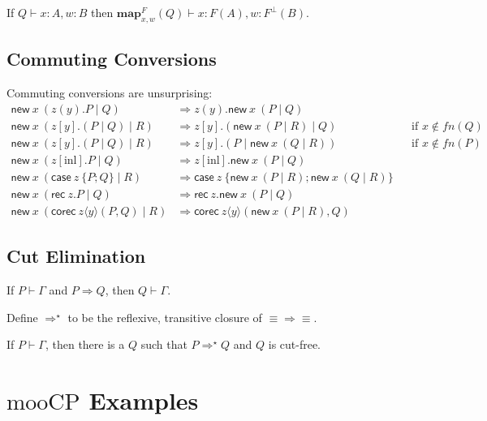 \documentclass[orivec,envcountsame]{llncs}
\newcommand{\cpdual}[1]{#1^\perp}
\newcommand{\cptyp}[2]{#1 \vdash #2}
\newcommand{\expand}[3]{\mathbf{map}^{#1}_{#2}(#3)}
\newcommand{\mkwd}[1]{\mathsf{#1}}
\newcommand{\cut}[4]{\mkwd{new}\:#1 \: (#3 \mid #4)}
\newcommand{\rec}[1]{\mkwd{rec}\:#1}
\newcommand{\corec}[5]{\mkwd{corec}\:#1 \langle #2 \rangle (#4,#5)}
\newcommand{\clabel}[1]{\mathrm{#1}}
\renewcommand{\case}[2]{\mkwd{case}\:#1\:\{#2\}}
\newcommand{\sel}[2]{#1[\clabel{#2}]}
\newcommand{\mucp}{$\mathrm{mooCP}$\xspace}
\begin{document}
\begin{lemma}
  If $\cptyp{Q}{x:A,w:B}$ then \(\cptyp{\expand{F}{x,w}{Q}}{x:F(A), w:\cpdual{F}(B)}.\)
\end{lemma}

\subsection{Commuting Conversions}

Commuting conversions are unsurprising:
{\small\begin{align*}
  \cut{x}{A}{z(y).P}{Q} &\Longrightarrow z(y).\cut{x}{A}{P}{Q} \\
  \cut{x}{A}{z[y].(P \mid Q)}{R} &\Longrightarrow z[y].(\cut{x}{A}{P}{R} \mid Q) &&\text{if $x \not\in fn(Q)$} \\
  \cut{x}{A}{z[y].(P \mid Q)}{R} &\Longrightarrow z[y].(P \mid \cut{x}{A}{Q}{R}) &&\text{if $x \not\in fn(P)$} \\
  \cut{x}{A}{\sel{z}{inl}.P}{Q} &\Longrightarrow \sel{z}{inl}.\cut{x}{A}{P}{Q} \\
  \cut{x}{A}{\case{z}{P;Q}}{R} &\Longrightarrow \case{z}{\cut{x}{A}{P}{R}; \cut{x}{A}{Q}{R}} \\
  \cut{x}{A}{\rec{z}.P}{Q} &\Longrightarrow \rec{z}.\cut{x}{A}{P}{Q} \\
  \cut{x}{A}{\corec{z}{y}{B}{P}{Q}}{R} &\Longrightarrow \corec{z}{y}{B}{\cut{x}{A}{P}{R}}{Q}
\end{align*}}

\subsection{Cut Elimination}

\begin{theorem}
  If $\cptyp{P}{\Gamma}$ and $P \Longrightarrow Q$, then $\cptyp{Q}{\Gamma}.$
\end{theorem}

Define $\Longrightarrow^\star$ to be the reflexive, transitive closure of $\equiv\Longrightarrow\equiv$.

\begin{theorem}
  If $\cptyp{P}{\Gamma}$, then there is a $Q$ such that $P \Longrightarrow^\star Q$ and $Q$ is cut-free.
\end{theorem}

\section{\mucp Examples}
\end{document}
